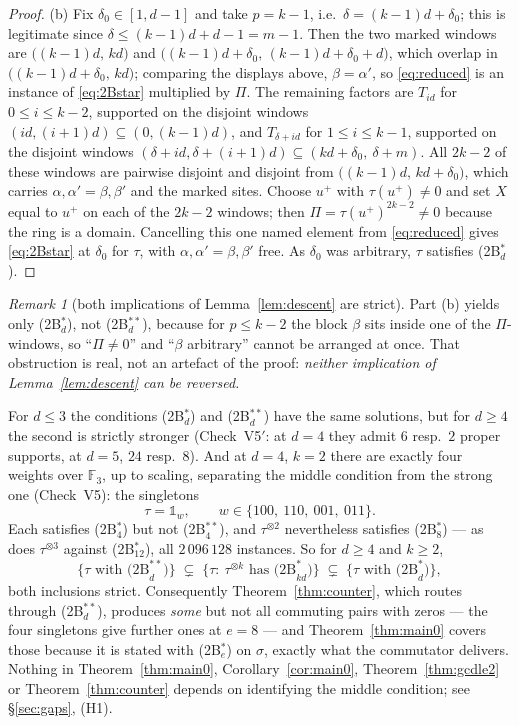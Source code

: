 \documentclass[11pt]{article}
\theoremstyle{definition}
\theoremstyle{remark}
\newtheorem{remark}[theorem]{Remark}
\newcommand{\F}{\mathbb{F}}
\begin{document}
\begin{proof}
(b) Fix $\delta_0\in[1,d-1]$ and take $p=k-1$, i.e.\ $\delta=(k-1)d+\delta_0$; this is
legitimate since $\delta\le (k-1)d+d-1=m-1$.  Then the two marked windows are
$\bigl((k-1)d,\,kd\bigr)$ and $\bigl((k-1)d+\delta_0,\,(k-1)d+\delta_0+d\bigr)$, which
overlap in $\bigl((k-1)d+\delta_0,\,kd\bigr)$; comparing the displays above, $\beta=\alpha'$,
so \eqref{eq:reduced} is an instance of \eqref{eq:2Bstar} multiplied by $\Pi$.  The
remaining factors are $T_{id}$ for $0\le i\le k-2$, supported on the disjoint windows
$(id,(i+1)d)\subseteq(0,(k-1)d)$, and $T_{\delta+id}$ for $1\le i\le k-1$, supported on the
disjoint windows $(\delta+id,\delta+(i+1)d)\subseteq(kd+\delta_0,\ \delta+m)$.  All $2k-2$
of these windows are pairwise disjoint and disjoint from $\bigl((k-1)d,\,kd+\delta_0\bigr)$,
which carries $\alpha,\alpha'=\beta,\beta'$ and the marked sites.  Choose $u^{+}$ with
$\tau(u^{+})\ne0$ and set $X$ equal to $u^{+}$ on each of the $2k-2$ windows; then
$\Pi=\tau(u^{+})^{2k-2}\ne0$ because the ring is a domain.  Cancelling this one named
element from \eqref{eq:reduced} gives \eqref{eq:2Bstar} at $\delta_0$ for $\tau$, with
$\alpha,\alpha'=\beta,\beta'$ free.  As $\delta_0$ was arbitrary, $\tau$ satisfies
(2B$^*_d$).
\end{proof}

\begin{remark}[both implications of Lemma~\ref{lem:descent} are strict]\label{rem:gap}
Part (b) yields only (2B$^*_d$), not (2B$^{**}_d$), because for $p\le k-2$ the block $\beta$
sits inside one of the $\Pi$-windows, so ``$\Pi\ne0$'' and ``$\beta$ arbitrary'' cannot be
arranged at once.  That obstruction is real, not an artefact of the proof: \emph{neither
implication of Lemma~\ref{lem:descent} can be reversed.}

For $d\le3$ the conditions (2B$^{*}_d$) and (2B$^{**}_d$) have the same solutions, but for
$d\ge4$ the second is strictly stronger (Check~V5$'$: at $d=4$ they admit $6$ resp.\ $2$
proper supports, at $d=5$, $24$ resp.\ $8$).  And at $d=4$, $k=2$ there are exactly four
weights over $\F_3$, up to scaling, separating the middle condition from the strong one
(Check~V5): the singletons
\[
  \tau=\mathbb{1}_{w},\qquad w\in\{100,\ 110,\ 001,\ 011\}.
\]
Each satisfies (2B$^{*}_4$) but not (2B$^{**}_4$), and $\tau^{\otimes2}$ nevertheless
satisfies (2B$^{*}_8$) --- as does $\tau^{\otimes3}$ against (2B$^{*}_{12}$), all
$2\,096\,128$ instances.  So for $d\ge4$ and $k\ge2$,
\[
   \bigl\{\tau \text{ with (2B}^{**}_d)\bigr\}\;\subsetneq\;
   \bigl\{\tau:\ \tau^{\otimes k}\text{ has (2B}^{*}_{kd})\bigr\}\;\subsetneq\;
   \bigl\{\tau \text{ with (2B}^{*}_d)\bigr\},
\]
both inclusions strict.  Consequently Theorem~\ref{thm:counter}, which routes through
(2B$^{**}_d$), produces \emph{some} but not all commuting pairs with zeros --- the four
singletons give further ones at $e=8$ --- and Theorem~\ref{thm:main0} covers those because
it is stated with (2B$^{*}_e$) on $\sigma$, exactly what the commutator delivers.  Nothing
in Theorem~\ref{thm:main0}, Corollary~\ref{cor:main0}, Theorem~\ref{thm:gcdle2} or
Theorem~\ref{thm:counter} depends on identifying the middle condition; see
§\ref{sec:gaps}, (H1).
\end{remark}
\end{document}
